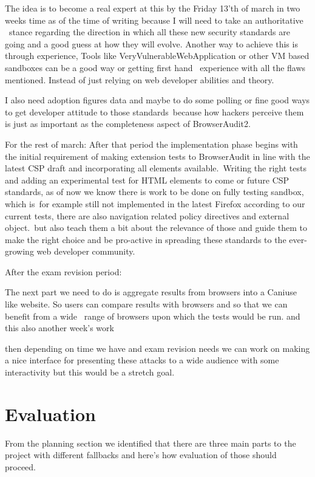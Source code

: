 \documentclass[a4paper,12pt]{paper}
\begin{document}
The idea is to become a real expert at this by the Friday 13'th of march in two weeks time as of the time of writing because I will need to take an authoritative \
stance regarding the direction in which all these new security standards are going and a good guess at how they will evolve.
Another way to achieve this is through experience, Tools like VeryVulnerableWebApplication or other VM based sandboxes can be a good way or getting first hand \
experience with all the flaws mentioned. Instead of just relying on web developer abilities and theory.

I also need adoption figures data and maybe to do some polling or fine good ways to get developer attitude to those standards\
because how hackers perceive them is just as important as the completeness aspect of BrowserAudit2.

For the rest of march:
After that period the implementation phase begins with the initial requirement of making extension tests to BrowserAudit in line with the latest CSP draft and incorporating all elements available.\
Writing the right tests and adding an experimental test for HTML elements to come or future CSP standards, as of now we know there is work to be done on fully testing sandbox, which is\
for example still not implemented in the latest Firefox according to our current tests, there are also navigation related policy directives and external object.\
but also teach them a bit about the relevance of those and guide them to make the right choice and be pro-active in spreading these standards to the ever-growing web developer community.\ 

After the exam revision period:

The next part we need to do is aggregate results from browsers into a Caniuse like website. So users can compare results with browsers and so that we can benefit from a wide \
range of browsers upon which the tests would be run. and this also another week's work\

then depending on time we have and exam revision needs we can work on making a nice interface for presenting these attacks to a wide audience with some interactivity but this would 
be a stretch goal.

\section{Evaluation}

From the planning section we identified that there are three main parts to the project with different fallbacks and here's how evaluation of those should proceed.\
\end{document}
